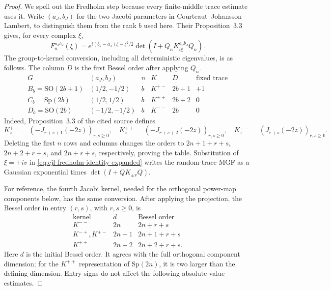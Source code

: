 \documentclass[11pt,reqno]{amsart}
\theoremstyle{plain}
\theoremstyle{definition}
\begin{document}
\begin{proof}
We spell out the Fredholm step because every finite-middle trace estimate
uses it.  Write \((a_J,b_J)\) for the two Jacobi parameters in
Courteaut--Johansson--Lambert, to distinguish them from the rank $b$ used
here.  Their Proposition~3.3 gives, for every complex \(\xi\),
\begin{equation}
\label{eq:cjl-fredholm-identity-expanded}
 F_n^{a_Jb_J}(\xi)
 =e^{i(b_J-a_J)\xi-\xi^2/2}
  \det(I+Q_nK^{a_Jb_J}_{i\xi}Q_n).
\end{equation}
The group-to-kernel conversion, including all deterministic eigenvalues, is
as follows.  The column $D$ is the first Bessel order after applying
$Q_n$.
\[
\begin{array}{c|c|c|c|c|c}
G&(a_J,b_J)&n&K&D&\text{fixed trace}\\ \hline
B_b=\mathrm{SO}(2b+1)&(1/2,-1/2)&b&K^{+-}&2b+1&+1\\
C_b=\mathrm{Sp}(2b)&(1/2,1/2)&b&K^{++}&2b+2&0\\
D_b=\mathrm{SO}(2b)&(-1/2,-1/2)&b&K^{--}&2b&0
\end{array}
\]
Indeed, Proposition~3.3 of the cited source defines
\[
 K^{+-}_z=(-J_{r+s+1}(-2z))_{r,s\ge0},\quad
 K^{++}_z=(-J_{r+s+2}(-2z))_{r,s\ge0},\quad
 K^{--}_z=(J_{r+s}(-2z))_{r,s\ge0}.
\]
Deleting the first $n$ rows and columns changes the orders to
$2n+1+r+s$, $2n+2+r+s$, and $2n+r+s$, respectively, proving the
table.  Substitution of \(\xi=\mp iv\) in
\eqref{eq:cjl-fredholm-identity-expanded} writes the random-trace MGF as a
Gaussian exponential times \(\det(I+QK_{\pm v}Q)\).

For reference, the fourth Jacobi kernel, needed for the orthogonal
power-map components below, has the same conversion.  After applying the
projection, the Bessel order in entry \((r,s)\), with \(r,s\geq0\), is
\[
\begin{array}{c|c|c}
\text{kernel}&d&\text{Bessel order}\\ \hline
K^{--}&2n&2n+r+s\\
K^{-+},K^{+-}&2n+1&2n+1+r+s\\
K^{++}&2n+2&2n+2+r+s.
\end{array}
\]
Here $d$ is the initial Bessel order.  It agrees with the full orthogonal
component dimension; for the $K^{++}$ representation of
\(\mathrm{Sp}(2n)\), it is two larger than the defining dimension.  Entry
signs do not affect the following absolute-value estimates.


\end{proof}
\end{document}
